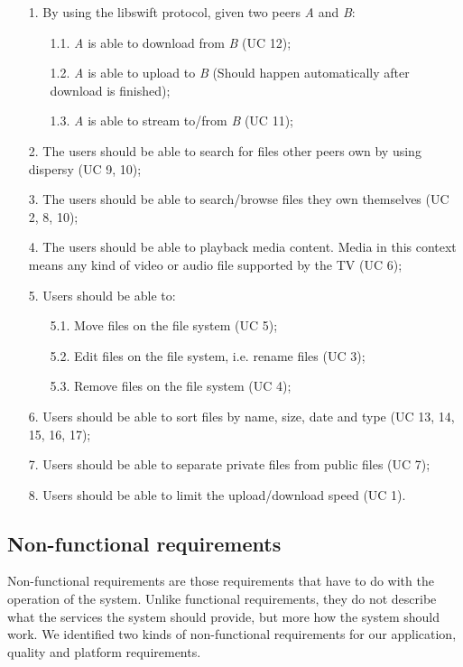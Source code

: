 \begin{itemize}
\item[1.] By using the libswift protocol, given two peers \textit{A} and \textit{B}:
	\begin{itemize}
	\item[1.1.] \textit{A} is able to download from \textit{B} (UC 12);
	\item[1.2.] \textit{A} is able to upload to \textit{B} (Should happen automatically after download is finished);
	\item[1.3.] \textit{A} is able to stream to/from \textit{B} (UC 11);
	\end{itemize}
\item[2.] The users should be able to search for files other peers own by using dispersy (UC 9, 10);
\item[3.] The users should be able to search/browse files they own themselves (UC 2, 8, 10);
\item[4.] The users should be able to playback media content. 
		  Media in this context means any kind of video or audio file supported by the TV (UC 6);
\item[5.] Users should be able to:
	\begin{itemize}
	\item[5.1.] Move files on the file system (UC 5);
	\item[5.2.] Edit files on the file system, i.e. rename files (UC 3);	
	\item[5.3.] Remove files on the file system (UC 4);
	
	\end{itemize}
\item[6.] Users should be able to sort files by name, size, date and type (UC 13, 14, 15, 16, 17); 
\item[7.] Users should be able to separate private files from public files (UC 7);
\item[8.] Users should be able to limit the upload/download speed (UC 1). 
\end{itemize}

\subsection{Non-functional requirements}
Non-functional requirements are those requirements that have to do with the operation of the system. 
Unlike functional requirements, they do not describe what the services the system should provide, 
but more how the system should work. We identified two kinds of non-functional requirements for our application, 
quality and platform requirements.


